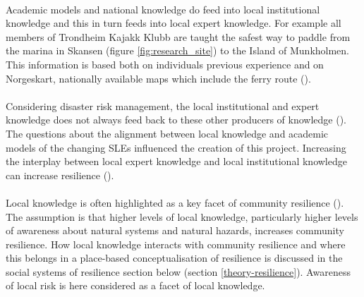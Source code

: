\paragraph{}

Academic models and national knowledge do feed into local institutional knowledge and this in turn feeds into local expert knowledge. For example all members of Trondheim Kajakk Klubb are taught the safest way to paddle from the marina in Skansen (figure \ref{fig:research_site}) to the Island of Munkholmen. This information is based both on individuals previous experience and on Norgeskart, nationally available maps which include the ferry route (\cite{kartverket_norgeskart_2023}). 

\paragraph{}
Considering disaster risk management, the local institutional and expert knowledge does not always feed back to these other producers of knowledge (\cite{rod_integrated_2012}). The questions about the alignment between local knowledge and academic models of the changing SLEs influenced the creation of this project. Increasing the interplay between local expert knowledge and local institutional knowledge can increase resilience (\cite{setten_we_2019}).

\paragraph{}

Local knowledge is often highlighted as a key facet of community resilience (\cite{setten_we_2019}). The assumption is that higher levels of local knowledge, particularly higher levels of awareness about natural systems and natural hazards, increases community resilience.  How local knowledge interacts with community resilience and where this belongs in a place-based conceptualisation of resilience is discussed in the social systems of resilience section below (section \ref{theory-resilience}). Awareness of local risk is here considered as a facet of local knowledge.  


 
